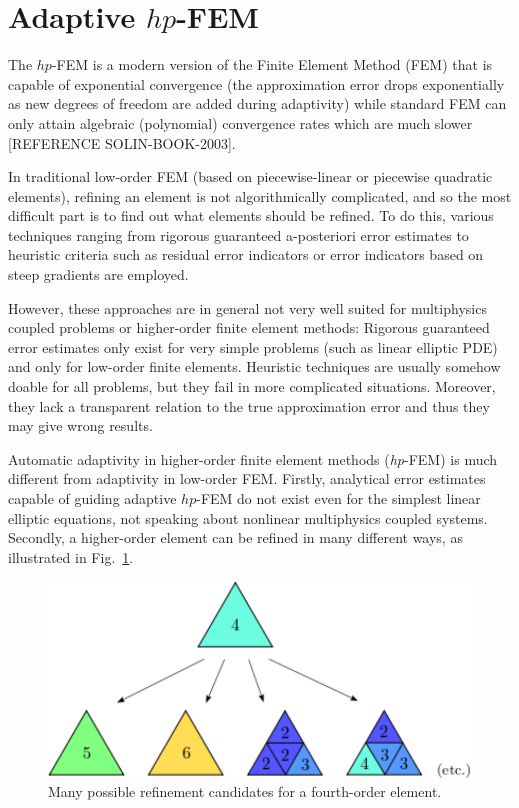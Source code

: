 \section{Adaptive $hp$-FEM}
\label{sec:hermes}

The $hp$-FEM is a modern version of the Finite Element Method (FEM) that is 
capable of exponential convergence (the approximation error drops exponentially 
as new degrees of freedom are added during adaptivity) while standard FEM can 
only attain algebraic (polynomial) convergence rates which are much slower
[REFERENCE SOLIN-BOOK-2003]. 

In traditional low-order FEM (based on piecewise-linear or piecewise quadratic elements), 
refining an element is not algorithmically complicated,
and so the most difficult part is to find out what elements should be refined. 
To do this, various techniques ranging from rigorous guaranteed a-posteriori 
error estimates to heuristic criteria such as residual error indicators or
error indicators based on steep gradients are employed. 

However, these approaches are in general not very well suited for 
multiphysics coupled problems or higher-order finite element methods: 
Rigorous guaranteed error estimates only exist for very simple problems 
(such as linear elliptic PDE) and only for low-order finite elements.
Heuristic techniques are usually somehow doable for all problems, but 
they fail in more complicated situations. Moreover, they lack a 
transparent relation to the true approximation error and thus they may
give wrong results.

Automatic adaptivity in higher-order finite element methods (\emph{hp}-FEM) 
is much different from adaptivity in low-order FEM. Firstly, analytical
error estimates capable of guiding adaptive $hp$-FEM do not exist even for 
the simplest linear elliptic equations, not speaking about nonlinear multiphysics 
coupled systems. Secondly,
a higher-order element can be refined in many different ways, as illustrated 
in Fig.~\ref{fig:refinements}.
\begin{figure}[!ht]
  \begin{centering}
  \includegraphics[width=0.5\columnwidth]{refinements}
  \caption{\label{fig:refinements} Many possible refinement candidates for a fourth-order
  element.}
  \end{centering}
\end{figure}

